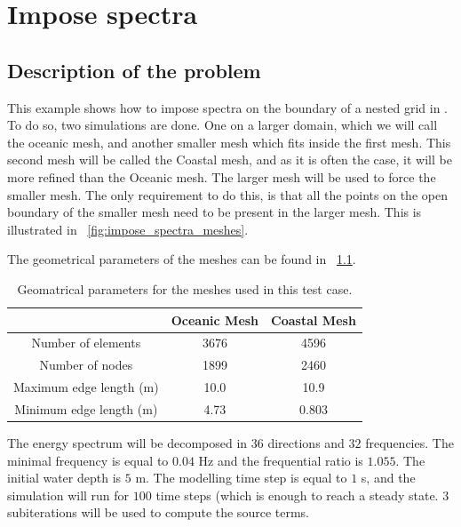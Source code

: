 \chapter{Impose spectra}
%

\section{Description of the problem}
%
This example shows how to impose spectra on the boundary of a nested grid in \tomawac.
To do so, two simulations are done. One on a larger domain, which we will call the oceanic mesh, and
another smaller mesh which fits inside the first mesh. This second mesh will be called the Coastal mesh,
and as it is often the case, it will be more refined than the Oceanic mesh. The larger mesh will be used
to force the smaller mesh. The only requirement to do this, is that all the points on the open boundary
of the smaller mesh need to be present in the larger mesh. This is illustrated in
\figurename~\ref{fig:impose_spectra_meshes}.

The geometrical parameters of the meshes can be found in \tablename~\ref{tab:impose_spectra_meshes}.

\begin{table}[H]
\begin{center}
%
\caption{Geomatrical parameters for the meshes used in this test case.}
\label{tab:impose_spectra_meshes}
%
\begin{tabular*}{0.7\linewidth}{@{\extracolsep{\fill}}ccc}
\toprule
\toprule
 & \textbf{Oceanic Mesh} & \textbf{Coastal Mesh} \\
\midrule
Number of elements      & 3676 & 4596  \\
Number of nodes         & 1899 & 2460  \\
Maximum edge length (m) & 10.0 & 10.9  \\
Minimum edge length (m) & 4.73 & 0.803 \\
\bottomrule
\bottomrule
\end{tabular*}
%
\end{center}
\end{table}

The energy spectrum will be decomposed in $36$ directions and $32$ frequencies. The minimal frequency is equal to $0.04$ Hz and the frequential ratio is $1.055$. The initial water depth is $5$ m. The modelling time step is equal to $1$ s, and the simulation will run for $100$ time steps (which is enough to reach a steady state. $3$ subiterations will be used to compute the source terms.

